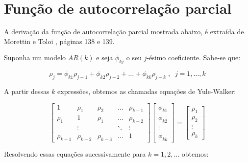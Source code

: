 
\chapter{Função de autocorrelação parcial}
\label{ap:facp}

A derivação da função de autocorrelação parcial mostrada abaixo, é extraída de Morettin e Toloi \citep{morettin}, páginas 138 e 139.

Suponha um modelo $AR(k)$ e seja $\phi_{kj}$ o seu $j$-ésimo coeficiente. Sabe-se que:

\[
\rho_j = \phi_{k1}\rho_{j-1} + \phi_{k2}\rho_{j-2} + \ldots + \phi_{kk}\rho_{j-k} \;,\;\;
j=1,\ldots,k
\]

A partir dessas $k$ expressões, obtemos as chamadas equações de Yule-Walker:

\begin{equation}\label{eq:yule}
\left[ \begin{array}{ccccc}
1 & \rho_1 & \rho_2 & \ldots & \rho_{k-1}\\
\rho_1 & 1 & \rho_1 & \ldots & \rho_{k-2}\\
 & \vdots &  & \ddots & \vdots\\
\rho_{k-1} & \rho_{k-2} & \rho_{k-3} & \ldots & 1
\end{array}  \right]
\left[ \begin{array}{c}
\phi_{k1}\\
\phi_{k2}\\
\vdots\\
\phi_{kk}
\end{array}  \right]
=
\left[ \begin{array}{c}
\rho_1\\
\rho_2\\
\vdots\\
\rho_k
\end{array}  \right]
\end{equation}

Resolvendo essas equações sucessivamente para $k=1, 2, \ldots$ obtemos:

